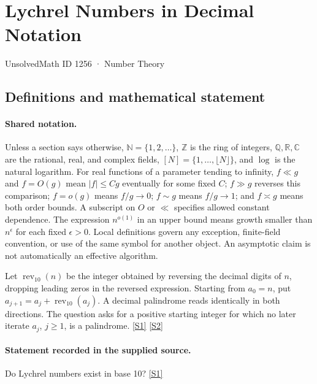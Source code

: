 \documentclass[11pt,a4paper]{article}
\newcommand{\N}{\mathbb{N}}
\newcommand{\Z}{\mathbb{Z}}
\newcommand{\Q}{\mathbb{Q}}
\newcommand{\R}{\mathbb{R}}
\newcommand{\C}{\mathbb{C}}
\newcommand{\sref}[2]{\hyperlink{source:#1:#2}{[S#2]}}
\begin{document}

\setcounter{section}{1255}

\section{Lychrel Numbers in Decimal Notation}\label{1256}

{\small\sffamily UnsolvedMath ID 1256 · Number Theory}

\subsection{Definitions and mathematical statement}

\paragraph{Shared notation.}Unless a section says otherwise, $\N=\{1,2,\ldots\}$,
$\Z$ is the ring of integers, $\Q,\R,\C$ are the rational, real, and complex
fields, $[N]=\{1,\ldots,\lfloor N\rfloor\}$, and $\log$ is the natural
logarithm. For real functions of a parameter tending to infinity,
$f\ll g$ and $f=O(g)$ mean $|f|\leq Cg$ eventually for some fixed $C$;
$f\gg g$ reverses this comparison; $f=o(g)$ means $f/g\to0$;
$f\sim g$ means $f/g\to1$; and $f\asymp g$ means both order bounds.
A subscript on $O$ or $\ll$ specifies allowed constant dependence.
The expression $n^{o(1)}$ in an upper bound means growth smaller than
$n^\epsilon$ for each fixed $\epsilon>0$. Local definitions govern any
exception, finite-field convention, or use of the same symbol for another
object. An asymptotic claim is not automatically an effective algorithm.



Let $\operatorname{rev}_{10}(n)$ be the integer obtained by reversing the decimal digits of $n$, dropping leading zeros in the reversed expression. Starting from $a_0=n$, put $a_{j+1}=a_j+\operatorname{rev}_{10}(a_j)$. A decimal palindrome reads identically in both directions. The question asks for a positive starting integer for which no later iterate $a_j$, $j\geq1$, is a palindrome. \sref{1256}{1} \sref{1256}{2}

\paragraph{Statement recorded in the supplied source.}
Do Lychrel numbers exist in base 10? \sref{1256}{1}
\end{document}
